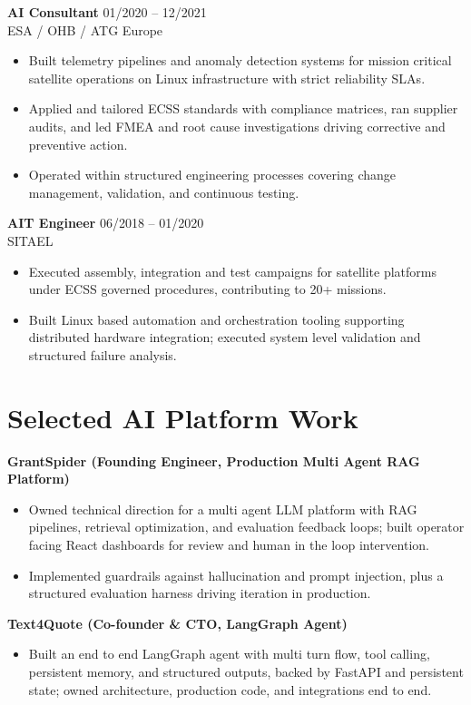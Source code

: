 \documentclass[a4paper,10pt]{article}
\newcommand{\entrygap}{\vspace{5pt}\Needspace*{4\baselineskip}}
\begin{document}
\entrygap
\textbf{AI Consultant} \hfill 01/2020 -- 12/2021 \\
ESA / OHB / ATG Europe
\begin{itemize}
    \item Built telemetry pipelines and anomaly detection systems for mission critical satellite operations on Linux infrastructure with strict reliability SLAs.
    \item Applied and tailored ECSS standards with compliance matrices, ran supplier audits, and led FMEA and root cause investigations driving corrective and preventive action.
    \item Operated within structured engineering processes covering change management, validation, and continuous testing.
\end{itemize}

\entrygap
\textbf{AIT Engineer} \hfill 06/2018 -- 01/2020 \\
SITAEL
\begin{itemize}
    \item Executed assembly, integration and test campaigns for satellite platforms under ECSS governed procedures, contributing to 20+ missions.
    \item Built Linux based automation and orchestration tooling supporting distributed hardware integration; executed system level validation and structured failure analysis.
\end{itemize}

\section*{Selected AI Platform Work}

\textbf{GrantSpider (Founding Engineer, Production Multi Agent RAG Platform)}
\begin{itemize}
    \item Owned technical direction for a multi agent LLM platform with RAG pipelines, retrieval optimization, and evaluation feedback loops; built operator facing React dashboards for review and human in the loop intervention.
    \item Implemented guardrails against hallucination and prompt injection, plus a structured evaluation harness driving iteration in production.
\end{itemize}

\vspace{4pt}
\textbf{Text4Quote (Co-founder \& CTO, LangGraph Agent)}
\begin{itemize}
    \item Built an end to end LangGraph agent with multi turn flow, tool calling, persistent memory, and structured outputs, backed by FastAPI and persistent state; owned architecture, production code, and integrations end to end.
\end{itemize}
\end{document}
